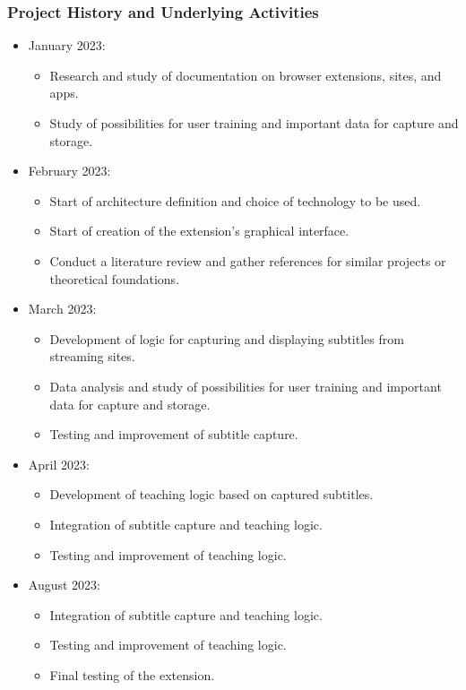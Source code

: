 \documentclass[12pt]{article}
\begin{document}
 

\subsubsection{Project History and Underlying Activities}
\begin{itemize}

\item January 2023:
\begin{itemize}
\item Research and study of documentation on browser extensions, sites, and apps.
\item Study of possibilities for user training and important data for capture and storage.
\end{itemize}

\item February 2023:
\begin{itemize}
\item Start of architecture definition and choice of technology to be used.
\item Start of creation of the extension's graphical interface.
\item Conduct a literature review and gather references for similar projects or theoretical foundations.
\end{itemize}

\item March 2023:
\begin{itemize}
\item Development of logic for capturing and displaying subtitles from streaming sites.
\item Data analysis and study of possibilities for user training and important data for capture and storage.
\item Testing and improvement of subtitle capture.
\end{itemize}

\item April 2023:
\begin{itemize}
\item Development of teaching logic based on captured subtitles.
\item Integration of subtitle capture and teaching logic.
\item Testing and improvement of teaching logic.
\end{itemize}

\item August 2023:
\begin{itemize}
\item Integration of subtitle capture and teaching logic.
\item Testing and improvement of teaching logic.
\item Final testing of the extension.
\end{itemize}


\end{itemize}
\end{document}
